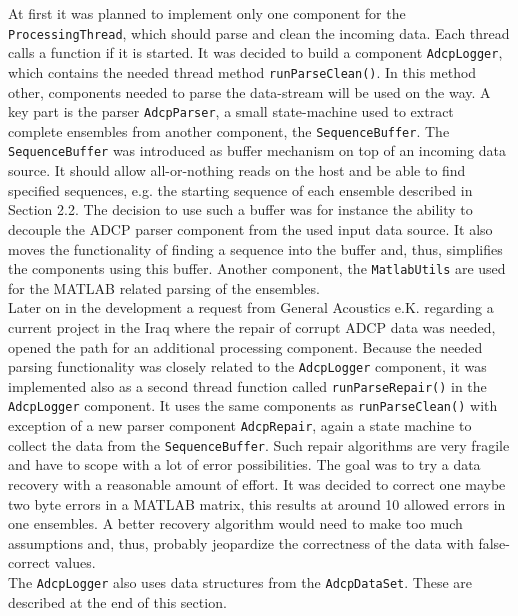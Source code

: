At first it was planned to implement only one component for the \texttt{ProcessingThread}, which should parse and clean the incoming data. Each thread calls a function if it is started. It was decided to build a component \texttt{AdcpLogger}, which contains the needed thread method \texttt{runParseClean()}. In this method other, components needed to parse the data-stream will be used on the way. A key part is the parser \texttt{AdcpParser}, a small state-machine used to extract complete ensembles from another component, the \texttt{SequenceBuffer}. The \texttt{SequenceBuffer} was introduced as buffer mechanism on top of an incoming data source. It should allow all-or-nothing reads on the host and be able to find specified sequences, e.g. the starting sequence of each ensemble described in Section 2.2. The decision to use such a buffer was for instance the ability to decouple the ADCP parser component from the used input data source. It also moves the functionality of finding a sequence into the buffer and, thus, simplifies the components using this buffer. Another component, the \texttt{MatlabUtils} are used for the MATLAB related parsing of the ensembles.\\
Later on in the development a request from General Acoustics e.K. regarding a current project in the Iraq where the repair of corrupt ADCP data was needed, opened the path for an additional processing component. Because the needed parsing functionality was closely related to the \texttt{AdcpLogger} component, it was implemented also as a second thread function called \texttt{runParseRepair()} in the \texttt{AdcpLogger} component. It uses the same components as \texttt{runParseClean()} with exception of a new parser component \texttt{AdcpRepair}, again a state machine to collect the data from the \texttt{SequenceBuffer}. Such repair algorithms are very fragile and have to scope with a lot of error possibilities. The goal was to try a data recovery with a reasonable amount of effort. It was decided to correct one maybe two byte errors in a MATLAB matrix, this results at around 10 allowed errors in one ensembles. A better recovery algorithm would need to make too much assumptions and, thus, probably jeopardize the correctness of the data with false-correct values.\\
The \texttt{AdcpLogger} also uses data structures from the \texttt{AdcpDataSet}. These are described at the end of this section.\\

